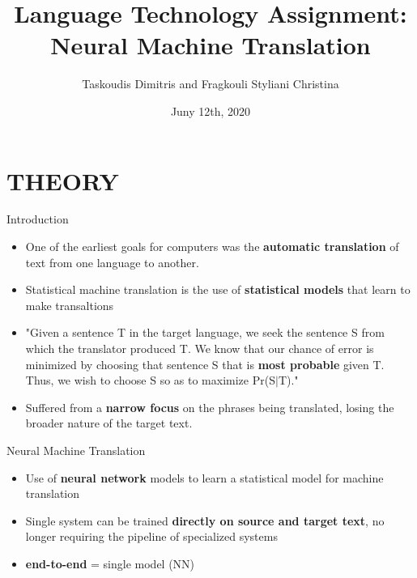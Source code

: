 \documentclass{beamer}
\title[Neural Machine Translation]{Language Technology Assignment: Neural Machine Translation}
\author[Taskoudis $\&$ Fragkouli]{Taskoudis Dimitris and Fragkouli Styliani Christina}
\institute{ Aristotle University of Thessaloniki\bigbreak
\normalsize{Language Technology Assignment}

}
\date{\small{ Juny 12th, 2020}}
\begin{document}
\frame{\titlepage}

\section{THEORY}

\begin{frame}{Introduction}
\begin{itemize}
\item One of the earliest goals for computers
was the \textbf{automatic translation} of text from one language to another.



\item Statistical machine translation is the
use of \textbf{statistical models} that learn to make transaltions



\item "Given a sentence T in the target language, we seek the sentence S from which the translator produced T. We know that our chance of error is minimized by choosing that sentence S that is \textbf{most probable} given T. Thus, we wish to choose S so as to maximize Pr(S$\vert$T)."


\item Suffered from a \textbf{narrow focus} on the phrases being
translated, losing the broader nature of the target text.

\end{itemize}
\end{frame}


\begin{frame}{Neural Machine Translation}
	\begin{itemize}
	\item Use of \textbf{neural network} models to learn a statistical model for machine translation
	
	\item Single system can be trained \textbf{directly on source and target text}, no longer requiring the pipeline of specialized systems
	
	\item \textbf{end-to-end} = single model (NN)
		
	\end{itemize}
\end{frame}

\end{document}
